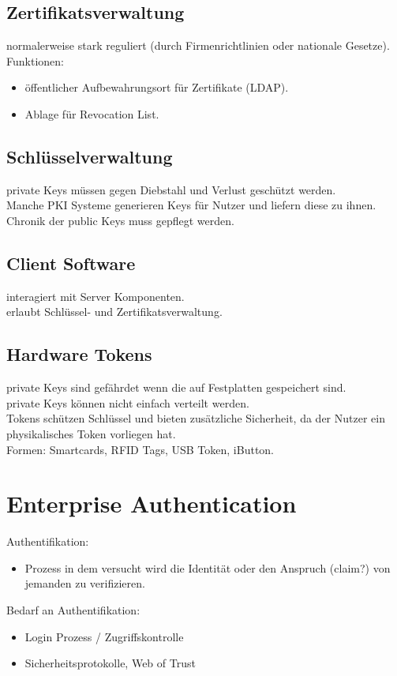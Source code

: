\documentclass{article} %
\begin{document}
\subsection{Zertifikatsverwaltung}
normalerweise stark reguliert (durch Firmenrichtlinien oder nationale Gesetze).\\
Funktionen:
\begin{itemize}
	\item öffentlicher Aufbewahrungsort für Zertifikate (LDAP).
    \item Ablage für Revocation List.
\end{itemize}
\subsection{Schlüsselverwaltung}
private Keys müssen gegen Diebstahl und Verlust geschützt werden.\\
Manche PKI Systeme generieren Keys für Nutzer und liefern diese zu ihnen.\\
Chronik der public Keys muss gepflegt werden.\\
\subsection{Client Software}
interagiert mit Server Komponenten.\\
erlaubt Schlüssel- und Zertifikatsverwaltung.\\
\subsection{Hardware Tokens}
private Keys sind gefährdet wenn die auf Festplatten gespeichert sind.\\
private Keys können nicht einfach verteilt werden.\\
Tokens schützen Schlüssel und bieten zusätzliche Sicherheit, da der Nutzer ein physikalisches Token vorliegen hat.\\
Formen: Smartcards, RFID Tags, USB Token, iButton.

\section{Enterprise Authentication}
Authentifikation:
\begin{itemize}
	\item Prozess in dem versucht wird die Identität oder den Anspruch (claim?) von jemanden zu verifizieren.
\end{itemize}
Bedarf an Authentifikation:
\begin{itemize}
	\item Login Prozess / Zugriffskontrolle
    \item Sicherheitsprotokolle, Web of Trust
\end{itemize}
\end{document}
